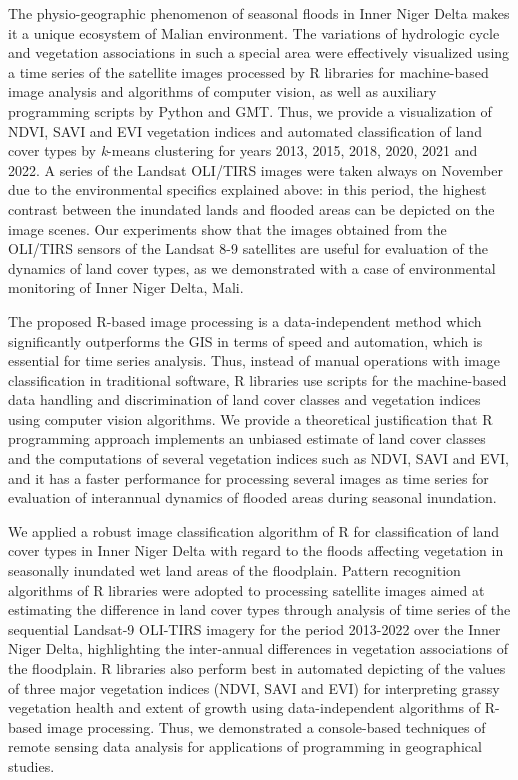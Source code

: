 \documentclass[remotesensing,article,submit,pdftex,moreauthors]{Definitions/mdpi}
\begin{document}
The physio-geographic phenomenon of seasonal floods in Inner Niger Delta makes it a unique ecosystem of Malian environment. The variations of hydrologic cycle and vegetation associations in such a special area were effectively visualized using a time series of the satellite images processed by R libraries for machine-based image analysis and  algorithms of computer vision, as well as auxiliary programming scripts by Python and GMT. Thus, we provide a visualization of NDVI, SAVI and EVI vegetation indices and automated classification of land cover types by \emph{k}-means clustering for years 2013, 2015, 2018, 2020, 2021 and 2022. A series of the Landsat OLI/TIRS images were taken always on November due to the environmental specifics explained above: in this period, the highest contrast between the inundated lands and flooded areas can be depicted on the image scenes. Our experiments show that  the images obtained from the OLI/TIRS sensors of the Landsat 8-9 satellites are useful for evaluation of the dynamics of land cover types, as we demonstrated with a case of environmental monitoring of Inner Niger Delta, Mali. 

The proposed R-based image processing is a data-independent method which significantly outperforms the GIS in terms of speed and automation, which is essential for time series analysis. Thus, instead of manual operations with image classification in traditional software, R libraries use scripts for the machine-based data handling and discrimination of land cover classes and vegetation indices using computer vision algorithms. We provide a theoretical justification that R programming approach implements an unbiased estimate of land cover classes and the computations of several vegetation indices such as NDVI, SAVI and EVI, and it has a faster performance for processing several images as time series for evaluation of interannual dynamics of flooded areas during seasonal inundation. 

We applied a robust image classification algorithm of R for classification of land cover types in Inner Niger Delta with regard to the floods affecting vegetation in seasonally inundated wet land areas of the floodplain. Pattern recognition algorithms of R libraries were adopted to processing satellite images aimed at estimating the difference in land cover types through analysis of time series of the sequential Landsat-9 OLI-TIRS imagery for the period 2013-2022 over the Inner Niger Delta, highlighting the inter-annual differences in vegetation associations of the floodplain. R libraries also perform best in automated depicting of the values of three major vegetation indices (NDVI, SAVI and EVI) for interpreting grassy vegetation health and extent of growth using data-independent algorithms of R-based image processing. Thus, we demonstrated a console-based techniques of remote sensing data analysis for applications of programming in geographical studies. 
\end{document}
